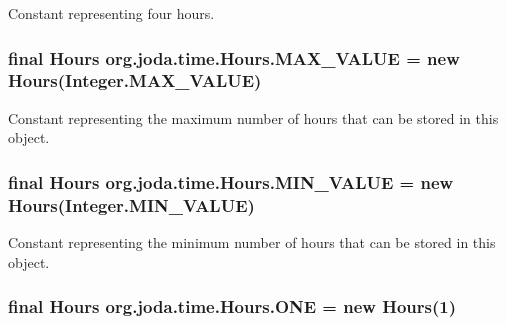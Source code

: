 Constant representing four hours. \hypertarget{classorg_1_1joda_1_1time_1_1_hours_aa176fe7102f0a157c8bf24dbd9d151a5}{
\subsubsection[{M\-A\-X\-\_\-\-V\-A\-L\-U\-E}]{\setlength{\rightskip}{0pt plus 5cm}final {\bf Hours} org.\-joda.\-time.\-Hours.\-M\-A\-X\-\_\-\-V\-A\-L\-U\-E = new {\bf Hours}(Integer.\-M\-A\-X\-\_\-\-V\-A\-L\-U\-E)\hspace{0.3cm}{\ttfamily [static]}}}\label{classorg_1_1joda_1_1time_1_1_hours_aa176fe7102f0a157c8bf24dbd9d151a5}
Constant representing the maximum number of hours that can be stored in this object. \hypertarget{classorg_1_1joda_1_1time_1_1_hours_a9565527ae81431323c1ab7bf18e8d11c}{
\subsubsection[{M\-I\-N\-\_\-\-V\-A\-L\-U\-E}]{\setlength{\rightskip}{0pt plus 5cm}final {\bf Hours} org.\-joda.\-time.\-Hours.\-M\-I\-N\-\_\-\-V\-A\-L\-U\-E = new {\bf Hours}(Integer.\-M\-I\-N\-\_\-\-V\-A\-L\-U\-E)\hspace{0.3cm}{\ttfamily [static]}}}\label{classorg_1_1joda_1_1time_1_1_hours_a9565527ae81431323c1ab7bf18e8d11c}
Constant representing the minimum number of hours that can be stored in this object. \hypertarget{classorg_1_1joda_1_1time_1_1_hours_aa794b7a00a463740acc766ac5c8c9eee}{
\subsubsection[{O\-N\-E}]{\setlength{\rightskip}{0pt plus 5cm}final {\bf Hours} org.\-joda.\-time.\-Hours.\-O\-N\-E = new {\bf Hours}(1)\hspace{0.3cm}{\ttfamily [static]}}}\label{classorg_1_1joda_1_1time_1_1_hours_aa794b7a00a463740acc766ac5c8c9eee}
